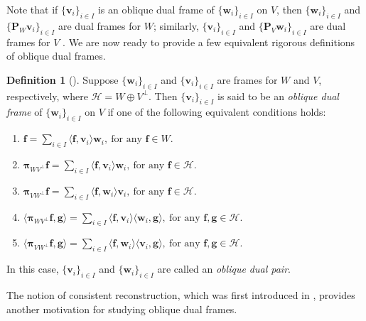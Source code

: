 \documentclass{amsart}
\numberwithin{equation}{section}
\newcommand{\bP}{{\mathbf P}}
\newcommand{\bpi}{{\boldsymbol{\pi}}}
\theoremstyle{plain}
\theoremstyle{remark}
\theoremstyle{definition}
\newtheorem{definition}[theorem]{Definition}
\begin{document}
Note that if $\{\mathbf{v}_i\}_{i\in I}$ is an oblique dual frame of $\{\mathbf{w}_i\}_{i\in I}$ on $V$, then $\{\mathbf{w}_i\}_{i\in I}$ and $\{\bP_W \mathbf{v}_i\}_{i\in I}$ are dual frames for $W$; similarly,
$\{\mathbf{v}_i\}_{i\in I}$ and $\{\bP_V \mathbf{w}_i\}_{i\in I}$ are dual frames for $V$ \cite{christensen2004oblique}.
We are now ready to provide a few equivalent rigorous definitions of oblique dual frames.


\begin{definition}[{\cite[Lemma 3.1]{christensen2004oblique}}]\label{def:obliquedual}
Suppose $\{\mathbf{w}_i\}_{i\in I}$ and $\{\mathbf{v}_i\}_{i\in I}$ are frames for $W$ and $V$, respectively, where $\mathcal{H} = W \oplus V^\perp$.  Then $\{\mathbf{v}_i\}_{i\in I}$ is said to be an \emph{oblique dual frame} of $\{\mathbf{w}_i\}_{i\in I}$ on $V$ if one of the following equivalent conditions holds:

\begin{enumerate}
    \item \label{it:perfect reconstruction} $\mathbf{f} = \sum_{i\in I} \langle \mathbf{f}, \mathbf{v}_i \rangle \mathbf{w}_i, \ \text{for any } \mathbf{f} \in W$. 

    \item $\bpi_{WV^\perp} \mathbf{f} = \sum_{i\in I} \langle \mathbf{f}, \mathbf{v}_i \rangle \mathbf{w}_i, \ \text{for any } \mathbf{f} \in \mathcal{H}$. 

    \item $\bpi_{VW^\perp} \mathbf{f} = \sum_{i\in I} \langle \mathbf{f}, \mathbf{w}_i \rangle \mathbf{v}_i, \ \text{for any } \mathbf{f} \in \mathcal{H}$. 

     \item $\langle \bpi_{WV^\perp} \mathbf{f}, \mathbf{g} \rangle = \sum_{i\in I} \langle \mathbf{f}, \mathbf{v}_i \rangle \langle \mathbf{w}_i, \mathbf{g} \rangle, \ \text{for any } \mathbf{f}, \mathbf{g} \in \mathcal{H}$. 

    \item $\langle \bpi_{VW^\perp} \mathbf{f}, \mathbf{g} \rangle = \sum_{i\in I} \langle \mathbf{f}, \mathbf{w}_i \rangle \langle \mathbf{v}_i, \mathbf{g} \rangle, \ \text{for any } \mathbf{f}, \mathbf{g} \in \mathcal{H}$. 
\end{enumerate}
In this case, $\{\mathbf{v}_i\}_{i\in I}$ and $\{\mathbf{w}_i\}_{i\in I}$  are called an \emph{oblique dual pair}.
\end{definition}


The notion of consistent reconstruction, which was first introduced in \cite{unser2002general}, provides another motivation for studying oblique dual frames. 
\end{document}

